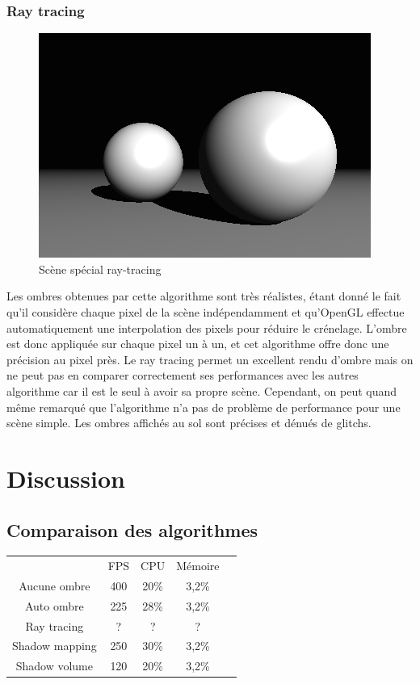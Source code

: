 \documentclass[a4paper,10pt]{report}
\begin{document}

\subsection{Ray tracing}

\begin{figure}[H]
\includegraphics[scale=0.4]{images/raytracing.png}
\centering
\caption{Scène spécial ray-tracing}
\end{figure}

Les ombres obtenues par cette algorithme sont très réalistes, étant donné le fait qu'il considère chaque pixel de la scène indépendamment et qu'OpenGL effectue automatiquement une interpolation des pixels pour réduire le crénelage. L'ombre est donc appliquée sur chaque pixel un à un, et cet algorithme offre donc une précision au pixel près. Le ray tracing permet un excellent rendu d'ombre mais on ne peut pas en comparer correctement ses performances avec les autres algorithme car il est le seul à avoir sa propre scène. Cependant, on peut quand m\^eme remarqué que l'algorithme n'a pas de problème de performance pour une scène simple. Les ombres affichés au sol sont précises et dénués de glitchs.


\chapter{Discussion}

\section{Comparaison des algorithmes}
\begin{table}[h]
\centering
\begin{tabular}{|c|c|c|c|l}
\cline{1-4}
 & FPS  & CPU & Mémoire  &  \\ \cline{1-4}
 Aucune ombre& 400 & 20\%  & 3,2\%  &  \\ \cline{1-4}
 Auto ombre& 225 & 28\%  & 3,2\%  &  \\ \cline{1-4}
 Ray tracing& ? & ?  & ?  &  \\ \cline{1-4}
 Shadow mapping& 250  & 30\%  & 3,2\%  &  \\ \cline{1-4}
 Shadow volume& 120  & 20\%  & 3,2\%  &  \\ \cline{1-4}
\end{tabular}
\end{table}
\end{document}
